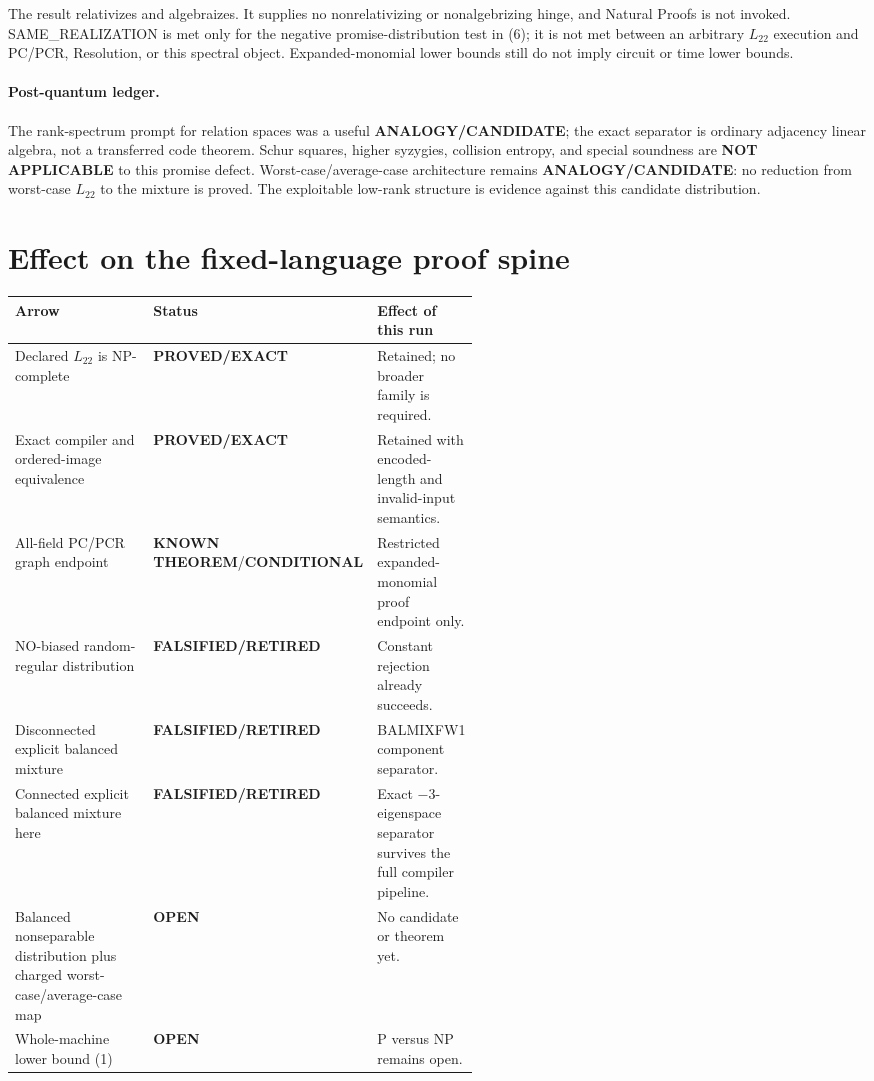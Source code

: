 \documentclass[11pt]{article}
\newcommand{\EXACT}{\textbf{PROVED/EXACT}}
\newcommand{\KNOWN}{\textbf{KNOWN THEOREM}}
\newcommand{\COND}{\textbf{CONDITIONAL}}
\newcommand{\OPEN}{\textbf{OPEN}}
\newcommand{\RET}{\textbf{FALSIFIED/RETIRED}}
\newcommand{\Ltwo}{L_{22}}
\begin{document}
The result relativizes and algebraizes.  It supplies no nonrelativizing or
nonalgebrizing hinge, and Natural Proofs is not invoked.  SAME\_REALIZATION is
met only for the negative promise-distribution test in (6); it is not met
between an arbitrary $\Ltwo$ execution and PC/PCR, Resolution, or this spectral
object.  Expanded-monomial lower bounds still do not imply circuit or time
lower bounds.

\paragraph{Post-quantum ledger.}
The rank-spectrum prompt for relation spaces was a useful
\textbf{ANALOGY/CANDIDATE}; the exact separator is ordinary adjacency linear
algebra, not a transferred code theorem.  Schur squares, higher syzygies,
collision entropy, and special soundness are \textbf{NOT APPLICABLE} to this
promise defect.  Worst-case/average-case architecture remains
\textbf{ANALOGY/CANDIDATE}: no reduction from worst-case $\Ltwo$ to the mixture
is proved.  The exploitable low-rank structure is evidence against this
candidate distribution.

\section{Effect on the fixed-language proof spine}
\begin{center}
\begin{tabularx}{0.98\linewidth}{@{}p{0.36\linewidth}p{0.18\linewidth}X@{}}
\toprule
Arrow & Status & Effect of this run\\
\midrule
Declared $\Ltwo$ is NP-complete & \EXACT & Retained; no broader family is required.\\
Exact compiler and ordered-image equivalence & \EXACT & Retained with encoded-length and invalid-input semantics.\\
All-field PC/PCR graph endpoint & \KNOWN/\COND & Restricted expanded-monomial proof endpoint only.\\
NO-biased random-regular distribution & \RET & Constant rejection already succeeds.\\
Disconnected explicit balanced mixture & \RET & BALMIXFW1 component separator.\\
Connected explicit balanced mixture here & \RET & Exact $-3$-eigenspace separator survives the full compiler pipeline.\\
Balanced nonseparable distribution plus charged worst-case/average-case map & \OPEN & No candidate or theorem yet.\\
Whole-machine lower bound (1) & \OPEN & P versus NP remains open.\\
\bottomrule
\end{tabularx}
\end{center}
\end{document}

